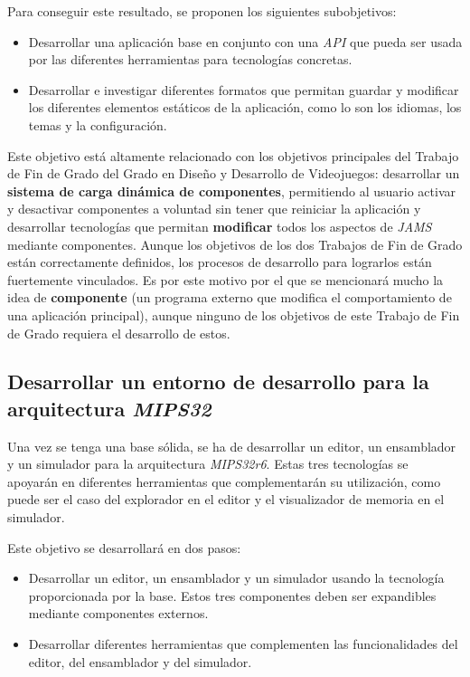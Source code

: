 \noindent Para conseguir este resultado, se proponen los siguientes subobjetivos:
\begin{itemize}
    \item Desarrollar una aplicación base en conjunto con una \textit{API} que pueda
    ser usada por las diferentes herramientas para tecnologías concretas.
    \item Desarrollar e investigar diferentes formatos que permitan guardar
    y modificar los diferentes elementos estáticos de la aplicación, como lo son
    los idiomas, los temas y la configuración.
\end{itemize}

\noindent Este objetivo está altamente relacionado con los
objetivos principales del Trabajo de Fin de Grado del Grado en
Diseño y Desarrollo de Videojuegos: desarrollar un \textbf{sistema de carga
dinámica de componentes}, permitiendo al usuario activar y desactivar
componentes a voluntad sin tener que reiniciar la aplicación y
desarrollar tecnologías que permitan \textbf{modificar}
todos los aspectos de \textit{JAMS} mediante componentes.
Aunque los objetivos de los dos Trabajos de Fin de Grado están
correctamente definidos, los procesos de desarrollo para lograrlos están
fuertemente vinculados.
Es por este motivo por el que se mencionará mucho la idea de \textbf{componente}
(un programa externo que modifica el comportamiento de una aplicación principal),
aunque ninguno de los objetivos de este Trabajo de Fin de Grado requiera el
desarrollo de estos.

\subsection{Desarrollar un entorno de desarrollo para la arquitectura \textit{MIPS32}}
\label{subsec:desarrollar-un-entorno-de-desarrollo-para-la-arquitectura-mips32}

Una vez se tenga una base sólida, se ha de desarrollar un editor, un ensamblador
y un simulador para la arquitectura \textit{MIPS32r6}.
Estas tres tecnologías se apoyarán en diferentes herramientas que complementarán
su utilización, como puede ser el caso del explorador en el editor y el visualizador
de memoria en el simulador.

\noindent Este objetivo se desarrollará en dos pasos:

\begin{itemize}
    \item Desarrollar un editor, un ensamblador y un simulador usando la tecnología
    proporcionada por la base.
    Estos tres componentes deben ser expandibles mediante componentes externos.
    \item Desarrollar diferentes herramientas que complementen las funcionalidades
    del editor, del ensamblador y del simulador.
\end{itemize}

